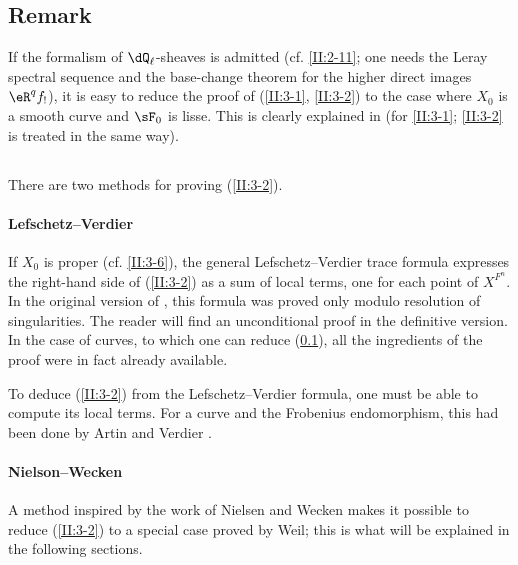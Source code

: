 \documentclass[oneside]{book}
\begin{document}
\subsection{Remark}\label{II:3-7}

If the formalism of $\dQ_\ell$-sheaves is admitted (cf. \ref{II:2-11}; one
needs the Leray spectral sequence and the base-change theorem for the higher
direct images $\eR^q f_!$), it is easy to reduce the proof of
(\ref{II:3-1}, \ref{II:3-2}) to the case where $X_0$ is a smooth curve and
$\sF_0$ is lisse. This is clearly explained in \cite[\S 5]{gr95} (for
\ref{II:3-1}; \ref{II:3-2} is treated in the same way).






\subsection{}\label{II:3-8}

There are two methods for proving (\ref{II:3-2}).



\paragraph{Lefschetz--Verdier}
If $X_0$ is proper (cf. \ref{II:3-6}), the general Lefschetz--Verdier trace
formula expresses the right-hand side of (\ref{II:3-2}) as a sum of local
terms, one for each point of $X^{F^n}$. In the original version of
\cite{sga5}, this formula was proved only modulo resolution of singularities.
The reader will find an unconditional proof in the definitive version. In
the case of curves, to which one can reduce (\ref{II:3-7}), all the
ingredients of the proof were in fact already available.

To deduce (\ref{II:3-2}) from the Lefschetz--Verdier formula, one must be
able to compute its local terms. For a curve and the Frobenius endomorphism,
this had been done by Artin and Verdier \cite{ve67}.



\paragraph{Nielson--Wecken}
A method inspired by the work of Nielsen and Wecken makes it possible to
reduce (\ref{II:3-2}) to a special case proved by Weil; this is what will be
explained in the following sections.
\end{document}
